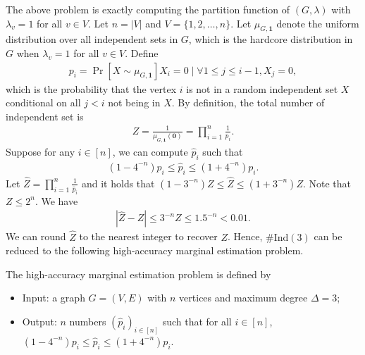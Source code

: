 The above problem is exactly computing the partition function of $(G,\lambda)$ with $\lambda_v = 1$ for all $v \in V$.
Let $n = |V|$ and $V = \{1,2,\ldots,n\}$. Let $\mu_{G,\bm{1}}$ denote the uniform distribution over all independent sets in $G$, which is the hardcore distribution in $G$ when $\lambda_v = 1$ for all $v \in V$. Define
\begin{align}\label{eq:def_pi}
    p_i = \Pr[X \sim \mu_{G,\bm{1}}]{X_i = 0 \mid \forall 1\leq j \leq i - 1, X_j = 0},
\end{align}
which is the probability that the vertex $i$ is not in a random independent set $X$ conditional on all $j < i$ not being in $X$. By definition, the total number of independent set is
\begin{align*}
    Z = \frac{1}{\mu_{G,\boldsymbol{1}}(\boldsymbol{0})} = \prod_{i=1}^n \frac{1}{p_i}.
\end{align*}
Suppose for any $i \in [n]$, we can compute $\hat{p}_i$ such that 
\begin{align}\label{eq:tar}
   (1 - 4^{-n})p_i \leq \hat{p}_i \leq (1+4^{-n})p_i.
\end{align}
Let $\hat{Z} = \prod_{i=1}^n \frac{1}{\hat{p}_i}$ and it holds that $(1-3^{-n})Z\leq \hat{Z} \leq (1+3^{-n})Z$. Note that $Z \leq 2^n$. We have
\begin{align*}
    |\hat{Z} - Z| \leq 3^{-n}Z \leq 1.5^{-n} < 0.01.
\end{align*}
We can round $\hat{Z}$ to the nearest integer to recover $Z$. Hence, $\#\text{Ind}(3)$ can be reduced to the following high-accuracy marginal estimation problem.
\begin{problem}\label{problem:mar} The high-accuracy marginal estimation problem is defined by
\begin{itemize}
    \item Input: a graph $G=(V,E)$ with $n$ vertices and maximum degree $\Delta = 3$;
    \item Output: $n$ numbers $(\hat{p}_i)_{i \in [n]}$ such that for all $ i \in [n]$, $(1 - 4^{-n})p_i \leq \hat{p}_i \leq (1+4^{-n})p_i$.
\end{itemize}
\end{problem}


